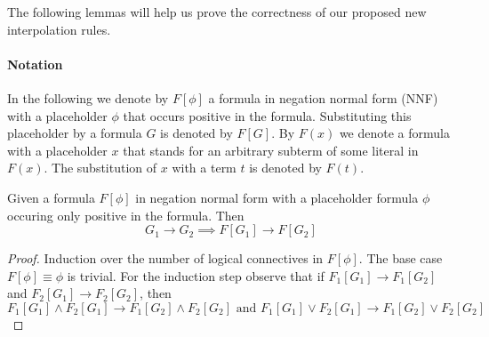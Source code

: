 \documentclass{llncs}
\begin{document}
The following lemmas will help us prove the correctness of our proposed new 
interpolation rules.

\paragraph{Notation} In the following we denote by $F[\phi]$ a formula 
in negation normal form (NNF) with a placeholder $\phi$ that occurs
positive in the formula.  Substituting this placeholder by a formula
$G$ is denoted by $F[G]$.  By $F(x)$ we denote a formula with a
placeholder $x$ that stands for an arbitrary subterm of some literal
in $F(x)$.  The substitution of $x$ with a term $t$ is denoted by $F(t)$.

\begin{lemma}[monotonicity]
  Given a formula $F[\phi]$ in negation normal form with a placeholder
  formula $\phi$ occuring only positive in the formula.  Then
  \[ G_1 \rightarrow G_2 \implies F[G_1] \rightarrow F[G_2] \]
\end{lemma}
\begin{proof}
  Induction over the number of logical connectives in $F[\phi]$.  The
  base case $F[\phi] \equiv \phi$ is trivial.  For the induction step
  observe that if $F_1[G_1]\rightarrow  F_1[G_2]$ and
  $F_2[G_1]\rightarrow  F_2[G_2]$, then 
  \[F_1[G_1] \land F_2[G_1] \rightarrow F_1[G_2] \land F_2[G_2] 
  \text{ and }
  F_1[G_1] \lor F_2[G_1] \rightarrow F_1[G_2] \lor F_2[G_2]\]
\end{proof}
\end{document}
